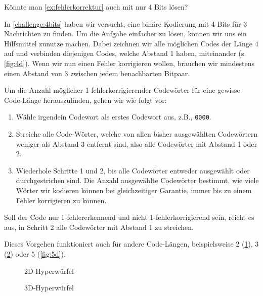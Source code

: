 \begin{mychallenge}\label{challenge:4bits}
    Könnte man \cref{ex:fehlerkorrektur} auch mit nur 4 Bits lösen?
\end{mychallenge}


In \cref{challenge:4bits} haben wir versucht, eine binäre Kodierung mit 4 Bits für 3 Nachrichten zu finden. Um die Aufgabe einfacher zu lösen, können wir uns ein Hilfsmittel zunutze machen. Dabei zeichnen wir alle möglichen Codes der Länge 4 auf und verbinden diejenigen Codes, welche Abstand 1 haben, miteinander (s. \cref{fig:4d}). Wenn wir nun einen Fehler korrigieren wollen, brauchen wir mindestens einen Abstand von 3 zwischen jedem benachbarten Bitpaar.

\begin{mydefinition}
Um die Anzahl möglicher 1-fehlerkorrigierender Codewörter für eine gewisse Code-Länge herauszufinden, gehen wir wie folgt vor:
\begin{enumerate}
    \item Wähle irgendein Codewort als erstes Codewort aus, z.B., \texttt{0000}.
    \item Streiche alle Code-Wörter, welche von allen bisher ausgewählten Codewörtern weniger als Abstand 3 entfernt sind, also alle Codewörter mit Abstand 1 oder 2.
    \item Wiederhole Schritte 1 und 2, bis alle Codewörter entweder ausgewählt oder durchgestrichen sind. Die Anzahl ausgewählte Codewörter bestimmt, wie viele Wörter wir kodieren können bei gleichzeitiger Garantie, immer bis zu einem Fehler korrigieren zu können.
\end{enumerate}
Soll der Code nur 1-fehlererkennend und nicht 1-fehlerkorrigierend sein, reicht es aus, in Schritt 2 alle Codewörter mit Abstand 1 zu streichen.

Dieses Vorgehen funktioniert auch für andere Code-Längen, beispielsweise 2 (\cref{fig:2d}), 3 (\cref{fig:3d}) oder 5 (\cref{fig:5d}).
\end{mydefinition}

\begin{figure}[H]
    \centering
    \caption{2D-Hyperwürfel}
    \label{fig:2d}
\end{figure}

\begin{figure}[H]
    \centering
    \caption{3D-Hyperwürfel}
    \label{fig:3d}
\end{figure}

